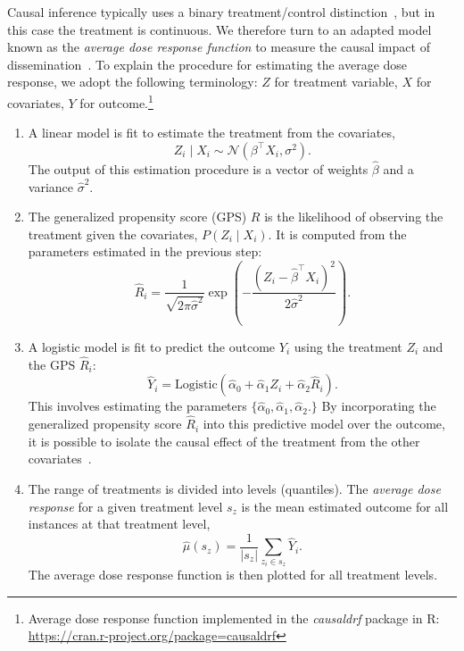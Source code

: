 Causal inference typically uses a binary treatment/control distinction~\cite{angrist1996}, but in this case the treatment is continuous. 
We therefore turn to an adapted model known as the \emph{average dose response function} to measure the causal impact of dissemination~\cite{imbens2000}.
To explain the procedure for estimating the average dose response, we adopt the following terminology: $Z$ for treatment variable, $X$ for covariates, $Y$ for outcome.\footnote{Average dose response function implemented in the \emph{causaldrf} package in R: \url{https://cran.r-project.org/package=causaldrf}}
\begin{enumerate}
\setlength{\itemsep}{1pt}
\item A linear model is fit to estimate the treatment from the covariates,
  \begin{equation}
    Z_{i} \mid X_{i} \sim \mathcal{N}(\beta^{\top} X_{i},\sigma^{2}).
  \end{equation}
  The output of this estimation procedure is a vector of weights $\hat{\beta}$ and a variance $\hat{\sigma}^2$. 
\item The generalized propensity score (GPS) $R$ is the likelihood of observing the treatment given the covariates, $P(Z_{i} \mid X_{i})$. It is computed from the parameters estimated in the previous step:
  \begin{equation}
    \hat{R}_i = \frac{1}{\sqrt{2\pi\hat{\sigma}^{2}}} \exp \left(-\frac{(Z_{i} - \hat{\beta}^{\top}X_{i})^{2}}{2\hat{\sigma}^{2}}\right).
  \end{equation}
\item A logistic model is fit to predict the outcome $Y_{i}$ using the treatment $Z_{i}$ and the GPS $\hat{R}_i$:
  \begin{equation}
    \hat{Y}_{i} = \text{Logistic}(\hat{\alpha}_{0} + \hat{\alpha}_{1}Z_{i} + \hat{\alpha}_{2}\hat{R}_i).
  \end{equation}
  This involves estimating the parameters $\{\hat{\alpha}_0, \hat{\alpha}_1, \hat{\alpha}_2.\}$
By incorporating the generalized propensity score $\hat{R}_i$ into this predictive model over the outcome, it is possible to isolate the causal effect of the treatment from the other covariates~\citep{hirano2004}.
\item The range of treatments is divided into levels (quantiles). The \emph{average dose response} for a given treatment level $s_{z}$ is the mean estimated outcome for all instances at that treatment level,
\begin{equation}
\hat{\mu}(s_{z}) = \frac{1}{| s_{z} |} \sum_{z_{i} \in s_{z}} \hat{Y}_{i}.
\end{equation}
The average dose response function is then plotted for all treatment levels.
\end{enumerate}

